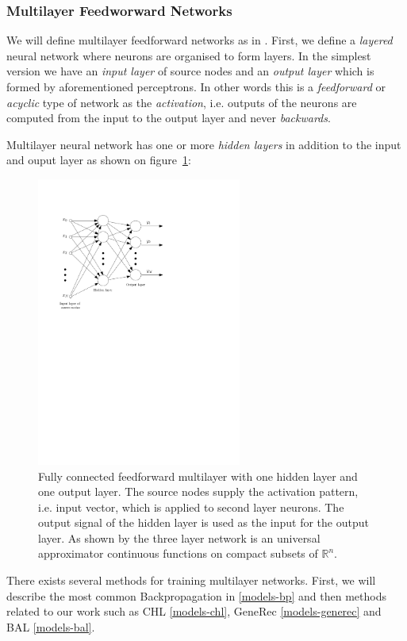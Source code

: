\subsubsection{Multilayer Feedworward Networks} 
\label{sec:theory-multilayer} 

We will define multilayer feedforward networks as in \citet{haykin1994neural}. First, we define a \emph{layered} neural network where neurons are organised to form layers. In the simplest version we have an \emph{input layer} of source nodes and an \emph{output layer} which is formed by aforementioned perceptrons. In other words this is a \emph{feedforward} or \emph{acyclic} type of network as the \emph{activation}, i.e. outputs of the neurons are computed from the input to the output layer and never \emph{backwards}. 

Multilayer neural network has one or more \emph{hidden layers} in addition to the input and ouput layer as shown on figure~\ref{fig:multilayer}: 

\begin{figure}[H]
  \centering
  \includegraphics[width=0.6\textwidth]{img/multilayer.pdf}    
  \caption{Fully connected feedforward multilayer with one hidden layer and one output layer. The source nodes supply the activation pattern, i.e. input vector, which is applied to second layer neurons. The output signal of the hidden layer is used as the input for the output layer. As shown by \citet{cybenko1989approximation} the three layer network is an universal approximator continuous functions on compact subsets of $\mathbb{R}^n$.} 
  \label{fig:multilayer}
\end{figure}

There exists several methods for training multilayer networks. First, we will describe the most common Backpropagation in \ref{models-bp} and then methods related to our work such as CHL \ref{models-chl}, GeneRec \ref{models-generec} and BAL \ref{models-bal}. 
